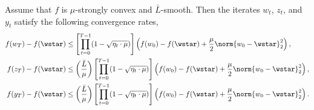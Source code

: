 \documentclass[10pt]{article} %
\newcommand{\yk}{y_t}
\newcommand{\zk}{z_t}
\newcommand{\wk}{w_t}
\newcommand{\etak}{\eta_{t}}
\newcommand{\rbr}[1]{\left(#1\right)}
\newcommand{\sbr}[1]{\left[#1\right]}
\begin{document}
\begin{proposition}\label{prop:accelerated-convergence}
    Assume that \( f \) is \( \mu \)-strongly convex and \( \bar{L} \)-smooth.
    Then the iterates \( \wk \), \( \zk \), and \( \yk \) satisfy the following
    convergence rates,
    \begin{equation}
        \begin{aligned}\label{eq:accelerated-convergence}
            f(w_T) - f(\wstar)
             & \leq \sbr{\prod_{t=0}^{T-1} (1 - \sqrt{\etak \cdot \mu})} \rbr{f(w_0) - f(\wstar)
            + \frac{\mu}{2} \norm{w_0 - \wstar}_2^2},                                            \\
            f(z_T) - f(\wstar)
             & \leq \rbr{\frac{\bar L}{\mu}}
            \sbr{\prod_{t=0}^{T-1} (1 - \sqrt{\etak \cdot \mu})} \rbr{f(w_0) - f(\wstar)
            + \frac{\mu}{2} \norm{w_0 - \wstar}_2^2},                                            \\
            f(y_T) - f(\wstar)
             & \leq \rbr{\frac{\bar L}{\mu}}
            \sbr{\prod_{t=0}^{T-1} (1 - \sqrt{\etak \cdot \mu})} \rbr{f(w_0) - f(\wstar)
                + \frac{\mu}{2} \norm{w_0 - \wstar}_2^2}.
        \end{aligned}
    \end{equation}
\end{proposition}
\end{document}
